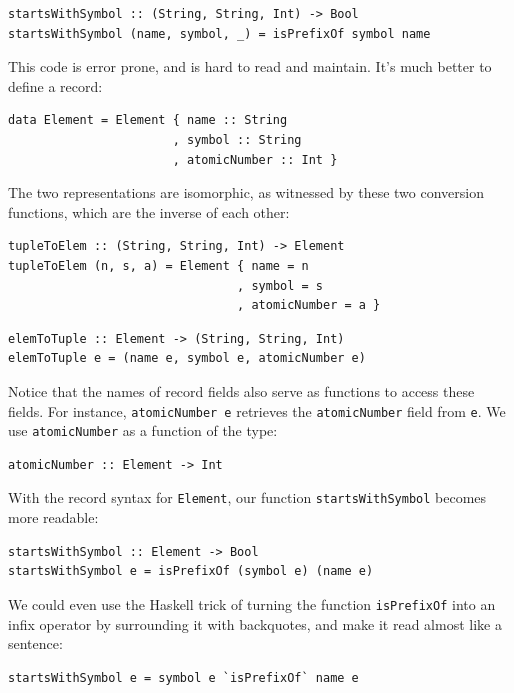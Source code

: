 \begin{verbatim}
startsWithSymbol :: (String, String, Int) -> Bool
startsWithSymbol (name, symbol, _) = isPrefixOf symbol name
\end{verbatim}

\noindent
This code is error prone, and is hard to read and maintain. It's much
better to define a record:

\begin{verbatim}
data Element = Element { name :: String 
                       , symbol :: String 
                       , atomicNumber :: Int }
\end{verbatim}

\noindent
The two representations are isomorphic, as witnessed by these two
conversion functions, which are the inverse of each other:

\begin{verbatim}
tupleToElem :: (String, String, Int) -> Element
tupleToElem (n, s, a) = Element { name = n 
                                , symbol = s 
                                , atomicNumber = a }
\end{verbatim}

\begin{verbatim}
elemToTuple :: Element -> (String, String, Int)
elemToTuple e = (name e, symbol e, atomicNumber e)
\end{verbatim}

\noindent
Notice that the names of record fields also serve as functions to access
these fields. For instance, \texttt{atomicNumber e} retrieves the
\texttt{atomicNumber} field from \texttt{e}. We use
\texttt{atomicNumber} as a function of the type:

\begin{verbatim}
atomicNumber :: Element -> Int
\end{verbatim}

With the record syntax for \texttt{Element}, our function
\texttt{startsWithSymbol} becomes more readable:

\begin{verbatim}
startsWithSymbol :: Element -> Bool
startsWithSymbol e = isPrefixOf (symbol e) (name e)
\end{verbatim}

\noindent
We could even use the Haskell trick of turning the function
\texttt{isPrefixOf} into an infix operator by surrounding it with
backquotes, and make it read almost like a sentence:

\begin{verbatim}
startsWithSymbol e = symbol e `isPrefixOf` name e
\end{verbatim}

